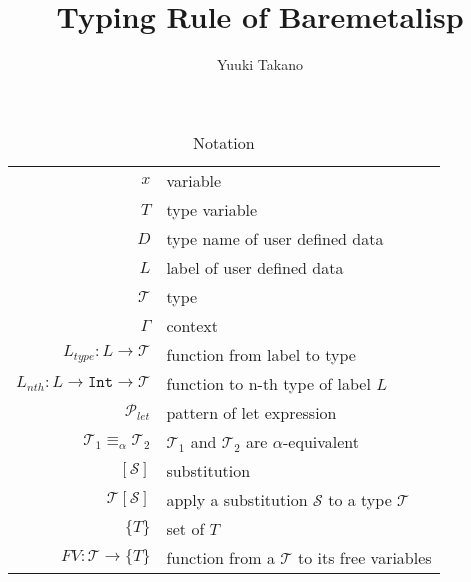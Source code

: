 \documentclass{article}
\title{Typing Rule of Baremetalisp}
\author{Yuuki Takano}
\begin{document}
\maketitle

\begin{table}
\caption{Notation}
    \centering
    \begin{tabular}{rl}
        $x$ & variable \\
        $T$ & type variable \\
        $D$ & type name of user defined data \\
        $L$ & label of user defined data \\
        $\mathcal{T}$ & type \\
        $\Gamma$ & context \\
        $L_{type} : L \rightarrow \mathcal{T}$ & function from label to type \\
        $L_{nth} : L \rightarrow \mathtt{Int} \rightarrow \mathcal{T}$ & function to n-th type of label $L$ \\
        $\mathcal{P}_{let}$ & pattern of let expression \\
        $\mathcal{T}_1 \equiv_\alpha \mathcal{T}_2$ & $\mathcal{T}_1$ and $\mathcal{T}_2$ are $\alpha$-equivalent \\
        $[\mathcal{S}]$ & substitution \\
        $\mathcal{T}[\mathcal{S}]$ & apply a substitution $\mathcal{S}$ to a type $\mathcal{T}$ \\
        $\{T\}$ & set of $T$ \\
        $FV : \mathcal{T} \rightarrow \{T\}$ & function from a $\mathcal{T}$ to its free variables\\
    \end{tabular}
\end{table}
\end{document}

